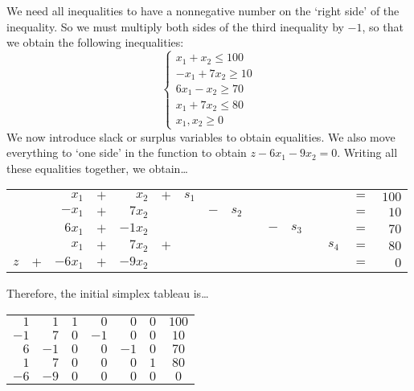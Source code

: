 \documentclass[11pt,letterpaper]{article}
\begin{document}
\sol We need all inequalities to have a nonnegative number on the `right side' of the inequality. So we must multiply both sides of the third inequality by $-1$, so that we obtain the following inequalities: 
	\[
	\begin{cases}
	x_1 + x_2 \leq 100 \\
	-x_1 + 7x_2 \geq 10 \\
	6x_1 - x_2 \geq 70 \\
	x_1 + 7x_2 \leq 80 \\
	x_1, x_2 \geq 0
	\end{cases}
	\]
We now introduce slack or surplus variables to obtain equalities. We also move everything to `one side' in the function to obtain $z - 6x_1 - 9x_2= 0$. Writing all these equalities together, we obtain\dots \par
	\begin{table}[H]
	\centering
	\begin{tabular}{rrrrrrrrrrrrrrrr}
	              & & $x_1$ & $+$ & $x_2$ & $+$ & $s_1$ & & & & & & & & $=$ & $100$ \\
	              & & $-x_1$ & $+$ & $7x_2$ & & & $-$ & $s_2$ & & & & & & $=$ & $10$ \\
	  	      & & $6x_1$ & $+$ & $-1x_2$ & & & & & & $-$ & $s_3$ & & & $=$ & $70$ \\
		      & & $x_1$ & $+$ & $7x_2$ & $+$ & & & & & & & & $s_4$ & $=$ & $80$ \\
	 $z$ & $+$ & $-6x_1$ & $+$ & $-9x_2$ & & & & & & & & & & $=$ & $0$ \\
	\end{tabular}
	\end{table} \par
Therefore, the initial simplex tableau is\dots \par
	\begin{table}[H]
	\centering
	\begin{tabular}{rrrrrr|c}
	$1$ & $1$ & $1$ & $0$ & $0$ & $0$ & $100$ \\
	$-1$ & $7$ & $0$ & $-1$ & $0$ & $0$ & $10$ \\
	$6$ & $-1$ & $0$ & $0$ & $-1$ & $0$ & $70$ \\
	$1$ & $7$ & $0$ & $0$ & $0$ & $1$ & $80$ \\ \hline
	$-6$ & $-9$ & $0$ & $0$ & $0$ & $0$ & $0$ \\
	\end{tabular}
	\end{table}
\end{document}

